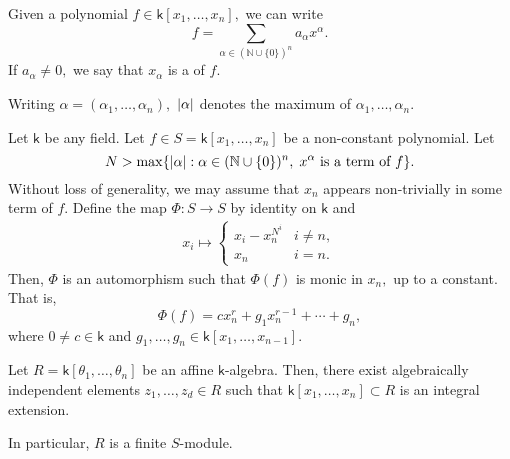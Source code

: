 \documentclass[12pt]{article}	%
\begin{document}
\begin{defn}%
	Given a polynomial $f \in \mathsf{k}[x_1, \ldots, x_n],$ we can write
	\begin{equation*} 
		f = \sum_{\alpha \in (\mathbb{N} \cup \{0\})^n} a_\alpha x^\alpha.
	\end{equation*}
	If $a_\alpha \neq 0,$ we say that $x_\alpha$ is a  of $f.$

	Writing $\alpha = (\alpha_1, \ldots, \alpha_n),$ ${\left\lvert \alpha \right\lvert}$ denotes the maximum of $\alpha_1, \ldots, \alpha_n.$
\end{defn}

\begin{prop}
	Let $\mathsf{k}$ be any field. Let $f \in S = \mathsf{k}[x_1, \ldots, x_n]$ be a non-constant polynomial. Let 
	\begin{equation*} 
		N > \max\{{\left\lvert \alpha \right\lvert} : \alpha \in (\mathbb{N} \cup \{0\})^n,\;x^{\alpha}\text{ is a term of }f\}.
	\end{equation*}
	Without loss of generality, we may assume that $x_n$ appears non-trivially in some term of $f.$ Define the map $\Phi : S \to S$ by identity on $\mathsf{k}$ and
	\begin{align*} 
		x_i \mapsto \begin{cases}
			x_i - x_n^{N^i} & i \neq n,\\
			x_n & i = n.
		\end{cases}
	\end{align*}
	Then, $\Phi$ is an automorphism such that $\Phi(f)$ is monic in $x_n,$ up to a constant. That is,
	\begin{equation*} 
		\Phi(f) = cx_n^r + g_1x_n^{r - 1} + \cdots + g_{n},
	\end{equation*}
	where $0 \neq c \in \mathsf{k}$ and $g_1, \ldots, g_n \in \mathsf{k}[x_1, \ldots, x_{n - 1}].$
\end{prop}

\begin{thm} \label{thm:NNL}
	Let $R = \mathsf{k}[\theta_1, \ldots, \theta_n]$ be an affine $\mathsf{k}$-algebra. Then, there exist algebraically independent elements $z_1, \ldots, z_d \in R$ such that $\mathsf{k}[x_1, \ldots, x_n] \subset R$ is an integral extension.
	\begin{center}
	\end{center}
	In particular, $R$ is a finite $S$-module.
\end{thm}
\end{document}
